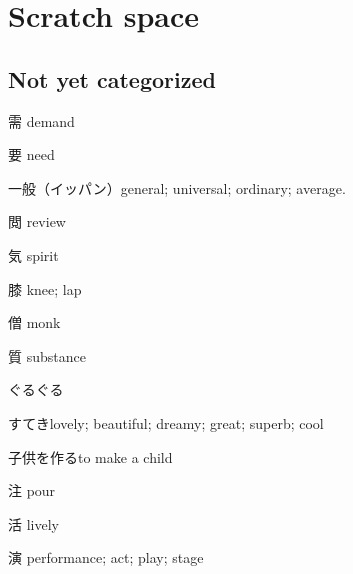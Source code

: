 \chapter{Scratch space}

\section{Not yet categorized}

需 demand

要 need

一般（イッパン）general; universal; ordinary; average.

閲 review

気 spirit

膝 knee; lap

僧 monk

質 substance

ぐるぐる

すてきlovely; beautiful; dreamy; great; superb; cool


子供を作るto make a child

注 pour

活 lively

演 performance; act; play; stage
